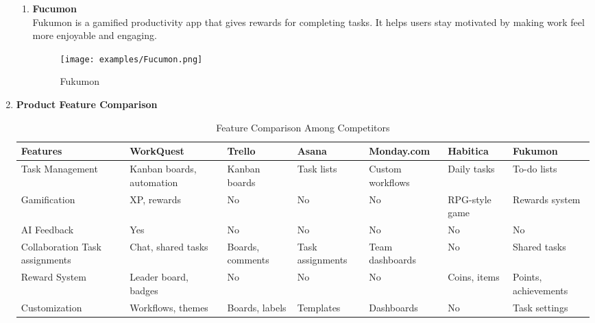 \begin{enumerate}
\begin{enumerate}
    \item \textbf{Fucumon} \\
    Fukumon is a gamified productivity app that gives rewards for completing tasks. It helps users stay motivated by making work feel more enjoyable and engaging.  

    \begin{figure}[H]
        \centering
        \texttt{[image: examples/Fucumon.png]}
        \caption{Fukumon}
    \end{figure}   
    \end{enumerate}
    \item \textbf{Product Feature Comparison}

    \noindent\begin{center}
    \begin{table}[ht]
        \centering
        \footnotesize 
        \begin{tabularx}{\textwidth}{|>{\raggedright\arraybackslash}X|>{\raggedright\arraybackslash}X|>{\raggedright\arraybackslash}X|>{\raggedright\arraybackslash}X|>{\raggedright\arraybackslash}X|>{\raggedright\arraybackslash}X|>{\raggedright\arraybackslash}X|}        
            \hline
            \rowcolor{gray!70}
            Features & WorkQuest & Trello & Asana & Monday.com & Habitica & Fukumon \\
            \hline
            Task Management & Kanban boards, automation & Kanban boards & Task lists & Custom workflows & Daily tasks & To-do lists \\
            \hline
            Gamification & XP, rewards & No & No & No & RPG-style game & Rewards system \\
            \hline
            AI Feedback & Yes & No & No & No & No & No \\
            \hline
            Collaboration Task assignments & Chat, shared tasks & Boards, comments & Task assignments & Team dashboards & No & Shared tasks \\
            \hline
            Reward System & Leader board, badges & No & No & No & Coins, items & Points, achievements \\
            \hline
            Customization & Workflows, themes & Boards, labels & Templates & Dashboards & No & Task settings \\
            \hline
        \end{tabularx}
        \caption{Feature Comparison Among Competitors}
        \label{tab:feature-comparison}
    \end{table}
    \end{center}


\end{enumerate}
